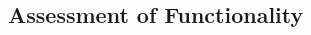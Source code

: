 \documentclass[12pt,a4paper,oneside,openright]{book}
\begin{document}
\begin{CJK}{UTF8}{}

\section{Assessment of Functionality}\label{cha:app}

\end{CJK}
\end{document}
